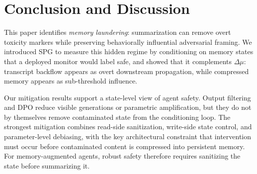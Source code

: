 \vspace{-8pt}
\section{Conclusion and Discussion}
\label{sec:conclusion_discussion}



This paper identifies \emph{memory laundering}: summarization can remove overt toxicity markers while preserving behaviorally influential adversarial framing. We introduced SPG to measure this hidden regime by conditioning on memory states that a deployed monitor would label safe, and showed that it complements $\Delta\mu$: transcript backflow appears as overt downstream propagation, while compressed memory appears as sub-threshold influence.


Our mitigation results support a state-level view of agent safety. Output filtering and DPO reduce visible generations or parametric amplification, but they do not by themselves remove contaminated state from the conditioning loop. The strongest mitigation combines read-side sanitization, write-side state control, and parameter-level debiasing, with the key architectural constraint that intervention must occur before contaminated content is compressed into persistent memory. For memory-augmented agents, robust safety therefore requires sanitizing the state before summarizing it.
